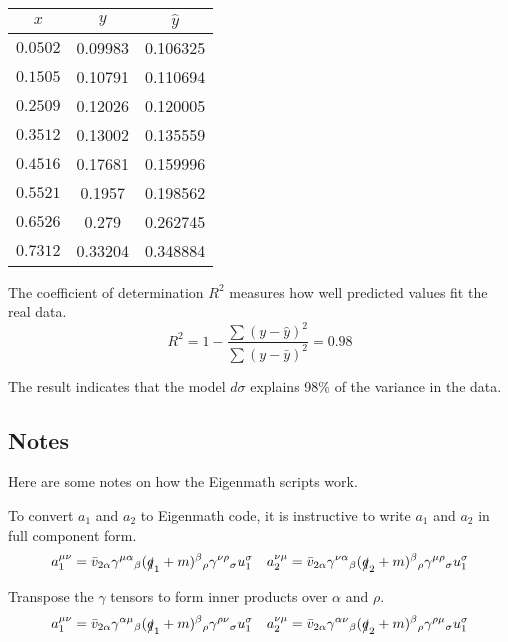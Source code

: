 \documentclass[12pt]{article}
\begin{document}
\begin{center}
\begin{tabular}{|c|c|c|}
\hline
$x$ & $y$ & $\hat{y}$\\
\hline
$0.0502$ & 0.09983 & 0.106325\\
$0.1505$ & 0.10791 & 0.110694\\
$0.2509$ & 0.12026 & 0.120005\\
$0.3512$ & 0.13002 & 0.135559\\
$0.4516$ & 0.17681 & 0.159996\\
$0.5521$ & 0.1957\phantom{0} & 0.198562\\
$0.6526$ & 0.279\phantom{00} & 0.262745\\
$0.7312$ & 0.33204 & 0.348884\\
\hline
\end{tabular}
\end{center}

\noindent
The coefficient of determination $R^2$ measures how well predicted values fit the real data.
\begin{equation*}
R^2=1-\frac{\sum(y-\hat{y})^2}{\sum(y-\bar{y})^2}=0.98
\end{equation*}

\noindent
The result indicates that the model $d\sigma$ explains 98\% of the variance in the data.

\subsection*{Notes}
Here are some notes on how the Eigenmath scripts work.

\bigskip
\noindent
To convert $a_1$ and $a_2$ to Eigenmath code,
it is instructive to write $a_1$ and $a_2$ in full component form.
\begin{equation*}
a_1^{\mu\nu}
=\bar{v}_{2\alpha}\gamma^{\mu\alpha}{}_\beta(\slashed{q}_1+m)^\beta{}_\rho\gamma^{\nu\rho}{}_\sigma u_1^\sigma
\quad
a_2^{\nu\mu}
=\bar{v}_{2\alpha}\gamma^{\nu\alpha}{}_\beta(\slashed{q}_2+m)^\beta{}_\rho\gamma^{\mu\rho}{}_\sigma u_1^\sigma
\end{equation*}

\noindent
Transpose the $\gamma$ tensors to form inner products over $\alpha$ and $\rho$.
\begin{equation*}
a_1^{\mu\nu}
=\bar{v}_{2\alpha}\gamma^{\alpha\mu}{}_\beta(\slashed{q}_1+m)^\beta{}_\rho\gamma^{\rho\nu}{}_\sigma u_1^\sigma
\quad
a_2^{\nu\mu}
=\bar{v}_{2\alpha}\gamma^{\alpha\nu}{}_\beta(\slashed{q}_2+m)^\beta{}_\rho\gamma^{\rho\mu}{}_\sigma u_1^\sigma
\end{equation*}
\end{document}
